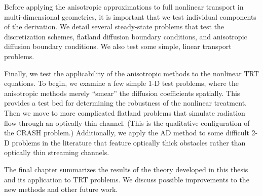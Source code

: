 Before applying the anisotropic approximations to full nonlinear transport in
multi-dimensional geometries, it is important that we test individual components
of the derivation. We detail several steady-state problems that test the
discretization schemes, flatland diffusion boundary conditions, and anisotropic
diffusion boundary conditions. We also test some simple, linear transport
problems.

Finally, we test the applicability of the anisotropic methods to the nonlinear
TRT equations. To begin, we examine a few simple 1-D test problems, where the
anisotropic methods merely ``smear'' the diffusion coefficients spatially.
This provides a test bed for determining the robustness of the nonlinear
treatment. Then
we move to more complicated flatland problems that simulate radiation flow
through an optically thin channel. (This is the qualitative configuration of
the CRASH problem.)
Additionally, we apply the AD method to some difficult 2-D problems in the
literature that feature optically thick obstacles rather than optically thin
streaming channels.

The final chapter summarizes the results of the theory developed in this thesis
and its application to TRT problems. We discuss possible improvements to the new
methods and other future work.


